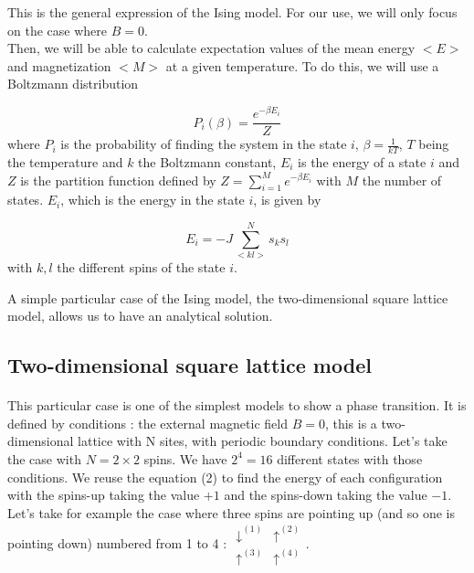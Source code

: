 \documentclass[a4paper, twoside, 11pt]{report}
\theoremstyle{theorem}
\theoremstyle{remark}
\theoremstyle{exemple}
\begin{document}
            This is the general expression of the Ising model. For our use, we will only focus on the case where $B=0$. \\
            Then, we will be able to calculate expectation values of the mean energy $<E>$ and magnetization $<M>$ at a given temperature. To do this, we will use a Boltzmann distribution
            
                \begin{equation*}
                    P_i(\beta) = \frac{e^{-\beta E_i}}{Z}
                \end{equation*}
            where $P_i$ is the probability of finding the system in the state $i$, $\beta = \frac{1}{kT}$, $T$ being the temperature and $k$ the Boltzmann constant, $E_i$ is the energy of a state $i$ and $Z$ is the partition function defined by $\displaystyle Z = \sum\limits_{i=1}^{M}e^{-\beta E_i}$ with $M$ the number of states. $E_i$, which is the energy in the state $i$, is given by 
            
                \begin{equation*}
                    E_i = -J \sum\limits_{<kl>}^{N}s_ks_l 
                    \tag{2}
                \end{equation*}
            with $k,l$ the different spins of the state $i$.
                
            A simple particular case of the Ising model, the two-dimensional square lattice model, allows us to have an analytical solution. 
        
        \subsection{Two-dimensional square lattice model}
        
            \paragraph{}This particular case is one of the simplest models to show a phase transition. It is defined by conditions : the external magnetic field $B=0$, this is a two-dimensional lattice with N sites, with periodic boundary conditions. Let's take the case with $N=2\times2$ spins. We have $2^4 = 16$ different states with those conditions. We reuse the equation (2) to find the energy of each configuration with the spins-up taking the value $+1$ and the spins-down taking the value $-1$. Let's take for example the case where three spins are pointing up (and so one is pointing down) numbered from 1 to 4 :
                $\begin{matrix}
                    \downarrow ^{(1)} & \uparrow ^{(2)}\\
                    \uparrow ^{(3)} & \uparrow ^{(4)}
                \end{matrix}$.
                
\end{document}

